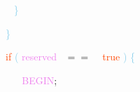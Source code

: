 \documentclass[8, usernames, dvipsnames]{beamer}
\begin{document}
\begin{frame}
 \textcolor{White}{\   }
\textcolor{White}{\   }
\textcolor{White}{\   }
\textcolor{White}{\   }
\textcolor{SkyBlue}{\} }

 \textcolor{White}{\   }
\textcolor{White}{\   }
\textcolor{White}{\   }
\textcolor{SkyBlue}{\} }

 \textcolor{White}{\   }
\textcolor{White}{\   }
\textcolor{White}{\   }
\textcolor{OrangeRed}{if}
\textcolor{SkyBlue}{(}
\textcolor{Violet}{reserved}\textcolor{White}{\ }
\textcolor{OliveGreen}{$==$}
\textcolor{White}{\ }
\textcolor{OrangeRed}{true}
\textcolor{SkyBlue}{)}
\textcolor{SkyBlue}{\{ }

 \textcolor{White}{\   }
\textcolor{White}{\   }
\textcolor{White}{\   }
\textcolor{White}{\   }
\textcolor{OrangeRed}{	}
\textcolor{White}{\ }
\textcolor{Violet}{BEGIN}\textcolor{Sepia}{;}

 \end{frame}
\end{document}
